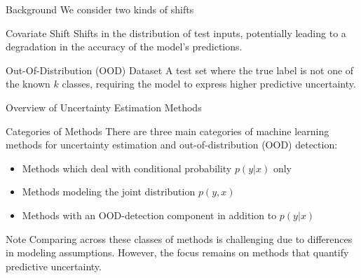 \documentclass{beamer}
\begin{document}
\begin{frame}{Background}
    We consider two kinds of shifts
    \begin{block}{Covariate Shift}
    Shifts in the distribution of test inputs, potentially leading to a degradation in the accuracy of the model's predictions.
    \end{block}
    \begin{block}{Out-Of-Distribution (OOD) Dataset}
    A test set where the true label is not one of the known \( k \) classes, requiring the model to express higher predictive uncertainty.
    \end{block}
\end{frame}

\begin{frame}{Overview of Uncertainty Estimation Methods}
    \begin{block}{Categories of Methods}
        There are three main categories of machine learning methods for uncertainty estimation and out-of-distribution (OOD) detection:
        \begin{itemize}
            \item Methods which deal with conditional probability \( p(y|x) \) only
            \item Methods modeling the joint distribution \( p(y, x) \)
            \item Methods with an OOD-detection component in addition to \( p(y|x) \)
        \end{itemize}
    \end{block}
    \begin{block}{Note}
        Comparing across these classes of methods is challenging due to differences in modeling assumptions. However, the focus remains on methods that quantify predictive uncertainty.
    \end{block}
\end{frame}
\end{document}
